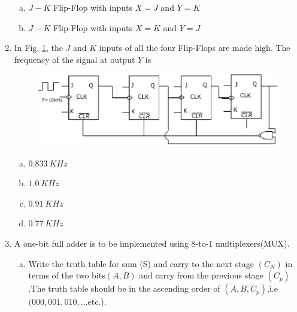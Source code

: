 \documentclass[journal,12pt,twocolumn]{IEEEtran}
\begin{document}
\begin{enumerate}
\begin{enumerate}[(a)]
\item $J-K$ Flip-Flop with inputs $X=J$ and $Y=K$

\item $J-K$ Flip-Flop with inputs $X=K$ and $Y=J$


\end{enumerate}
 
\item In Fig. \ref{fig:11}, the $J$ and $K$ inputs of all the four Flip-Flops are made high. The frequency of the signal at output $Y$ is

\begin{figure}

\centering

\includegraphics[width=\columnwidth]{./figs/15.eps}

\caption{}

\label{fig:11}

\end{figure} 



\begin{enumerate}[(a)]
 
\item $ 0.833 \ KHz$

\item $ 1.0 \ KHz$

\item $ 0.91 \ KHz$

\item $ 0.77 \ KHz$

\end{enumerate}



\item A one-bit full adder is to be implemented using $8$-to-$1$ multiplexers(MUX).

\begin{enumerate}[(a)]
 
\item Write the truth table for sum (S) and carry to the next stage $(C_N)$ in terms of the two bits$(A,B)$ and carry from the previous stage $(C_p)$.The truth table should be in the ascending order of $(A,B,C_p)$,i.e$(000,001,010,...$etc.).


\end{enumerate}
\end{enumerate}
\end{document}
